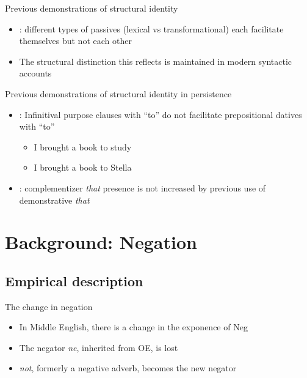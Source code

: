 \documentclass{digs-slides}
\newcommand{\includegraph}[1]{\mode<beamer>{}
    \mode<handout>{}}
\begin{document}
\begin{frame}{Previous demonstrations of structural identity}
	\begin{itemize}
          \item \textcite{Estival:1985}: different types of passives (lexical vs transformational) each facilitate themselves but not each other
          \item The structural distinction this reflects is maintained in modern syntactic accounts \parencite[e.g.][]{Embick:2004}
	\end{itemize}
        \begin{center}
            \includegraph{figures/estival}
        \end{center}
\end{frame}

\begin{frame}{Previous demonstrations of structural identity in persistence} %
	\begin{itemize}
          \item \textcite{Bock:1990}: Infinitival purpose clauses with
            “to” do not facilitate prepositional datives with “to”
            \begin{itemize}
              \item I brought a book to study
              \item I brought a book to Stella
            \end{itemize}
          \item \textcite{Ferreira:2003}: complementizer \textit{that}
            presence is not increased by previous use of demonstrative \textit{that}
	\end{itemize}
\end{frame}



\section{Background: Negation}

\subsection{Empirical description}
\label{sec:empirical-aspects}

\begin{frame}{The change in negation}
    \begin{itemize}
      \item In Middle English, there is a change in the exponence of Neg
      \item The negator \emph{ne}, inherited from OE, is lost
      \item \emph{not}, formerly a negative adverb, becomes the new negator
    \end{itemize}
\end{frame}
\end{document}
